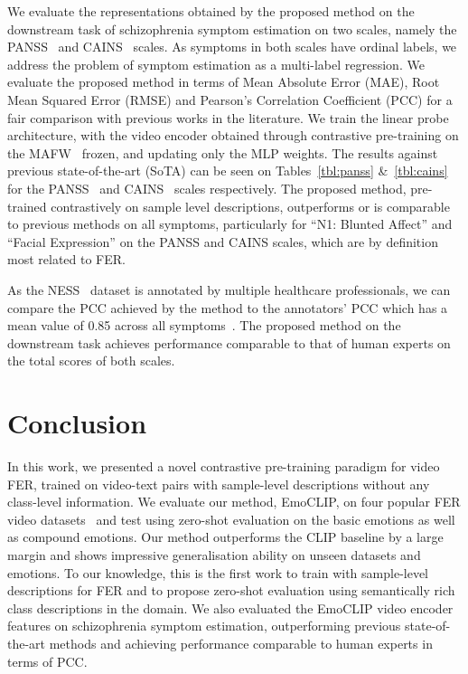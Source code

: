 \documentclass[10pt,twocolumn,letterpaper]{article}
\begin{document}
We evaluate the representations obtained by the proposed method on the downstream task of schizophrenia symptom estimation on two scales, namely the PANSS~\cite{kay_positive_1987} and CAINS~\cite{forbes_initial_2010} scales. As symptoms in both scales have ordinal labels, we address the problem of symptom estimation as a multi-label regression.
We evaluate the proposed method in terms of Mean Absolute Error (MAE), Root Mean Squared Error (RMSE) and Pearson's Correlation Coefficient (PCC) for a fair comparison with previous works in the literature.
We train the linear probe architecture, with the video encoder obtained through contrastive pre-training on the MAFW~\cite{liu_mafw_2022} frozen, and updating only the MLP weights.
The results against previous state-of-the-art (SoTA) can be seen on Tables~\ref{tbl:panss} \&~\ref{tbl:cains} for the PANSS~\cite{kay_positive_1987} and CAINS~\cite{forbes_initial_2010} scales respectively. The proposed method, pre-trained contrastively on sample level descriptions, outperforms or is comparable to previous methods on all symptoms, particularly for ``N1: Blunted Affect'' and ``Facial Expression'' on the PANSS and CAINS scales, which are by definition most related to FER.


As the NESS~\cite{ness} dataset is annotated by multiple healthcare professionals, we can compare the PCC achieved by the method to the annotators' PCC which has a mean value of 0.85 across all symptoms~\cite{bishay2019schinet, ness}. The proposed method on the downstream task achieves performance comparable to that of human experts on the total scores of both scales.



\section{Conclusion}
\label{sec:conclusion}

In this work, we presented a novel contrastive pre-training paradigm for video FER, trained on video-text pairs with sample-level descriptions without any class-level information. 
We evaluate our method, EmoCLIP, on four popular FER video datasets~\cite {afew, dfew, ferv39k, liu_mafw_2022} and test using zero-shot evaluation on the basic emotions as well as compound emotions. Our method outperforms the CLIP baseline by a large margin and shows impressive generalisation ability on unseen datasets and emotions. To our knowledge, this is the first work to train with sample-level descriptions for FER and to propose zero-shot evaluation using semantically rich class descriptions in the domain. We also evaluated the EmoCLIP video encoder features on schizophrenia symptom estimation, outperforming previous state-of-the-art methods and achieving performance comparable to human experts in terms of PCC.
\end{document}
